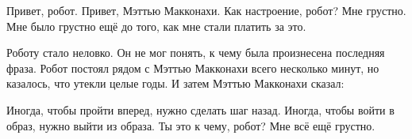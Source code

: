 \begin{dialog}
\X Привет, робот.
\R Привет, Мэттью Макконахи.
\X Как настроение, робот?
\R Мне грустно.
\X Мне было грустно ещё до того, как мне стали платить за это.
\end{dialog}

\begin{monolog}
Роботу стало неловко. Он не мог понять, к чему была произнесена последняя фраза. Робот постоял рядом с Мэттью Макконахи всего несколько минут, но казалось, что утекли целые годы. И затем Мэттью Макконахи сказал:
\end{monolog}

\begin{dialog}
\X Иногда, чтобы пройти вперед, нужно сделать шаг назад.
\R Иногда, чтобы войти в образ, нужно выйти из образа.
\X Ты это к чему, робот?
\R Мне всё ещё грустно.
\end{dialog}
